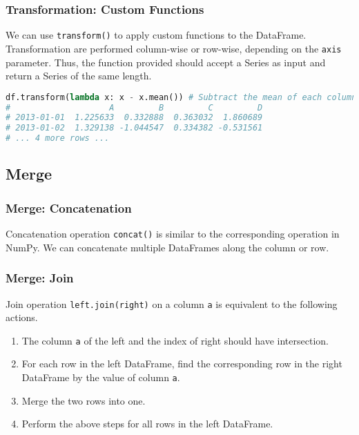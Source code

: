 \documentclass[beamer, en, version=2.0]{huangfusl-template}
\begin{document}
    \begin{frame}[fragile]
        \frametitle{Transformation: Custom Functions}

        We can use {\color{blue}\footnotesize\verb|transform()|} to apply custom functions to the DataFrame. Transformation are performed column-wise or row-wise, depending on the {\color{blue}\footnotesize\verb|axis|} parameter. Thus, the function provided should accept a Series as input and return a Series of the same length.

\begin{lstlisting}[language=python]
df.transform(lambda x: x - x.mean()) # Subtract the mean of each column
#                    A         B         C         D
# 2013-01-01  1.225633  0.332888  0.363032  1.860689
# 2013-01-02  1.329138 -1.044547  0.334382 -0.531561
# ... 4 more rows ...
\end{lstlisting}
    \end{frame}
    \subsection{Merge}
    \begin{frame}[fragile]
        \frametitle{Merge: Concatenation}

        Concatenation operation {\color{blue}\footnotesize\verb|concat()|} is similar to the corresponding operation in NumPy. We can concatenate multiple DataFrames along the column or row.
    \end{frame}
    \begin{frame}[fragile]
        \frametitle{Merge: Join}

        Join operation {\color{blue}\footnotesize\verb|left.join(right)|} on a column {\color{red}\footnotesize\verb|a|} is equivalent to the following actions.

        \begin{enumerate}
            \item The column {\color{red}\footnotesize\verb|a|} of the left and the index of right should have intersection.
            \item For each row in the left DataFrame, find the corresponding row in the right DataFrame by the value of column {\color{red}\footnotesize\verb|a|}.
            \item Merge the two rows into one.
            \item Perform the above steps for all rows in the left DataFrame.
        \end{enumerate}
    \end{frame}
\end{document}
